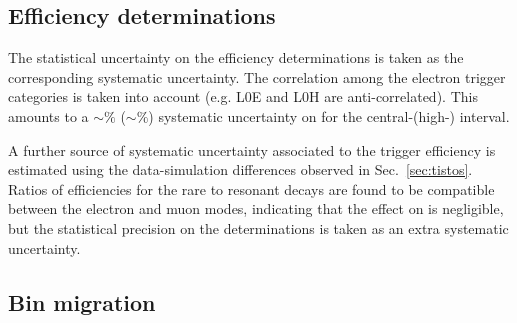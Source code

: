 \subsection{Efficiency determinations}

The statistical uncertainty on the efficiency determinations is taken as the corresponding systematic uncertainty.
The correlation among the electron trigger categories is taken into account (e.g. L0E and L0H are anti-correlated).
This amounts to a $\sim \%$ ($\sim \%$) systematic uncertainty on \RKst for the central-\qsq (high-\qsq) interval.

A further source of systematic uncertainty associated to the trigger efficiency is estimated using the data-simulation
differences observed in Sec.~\ref{sec:tistos}. Ratios of efficiencies for the rare to resonant decays are found to be 
compatible between the electron and muon modes, indicating that the effect on \RKst is negligible, but the statistical 
precision on the determinations is taken as an extra systematic uncertainty.


\subsection{Bin migration}

